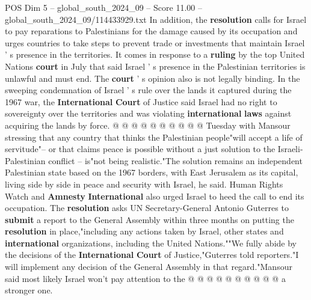 \begin{textsample}{POS Dim 5 – global\_south\_2024\_09 – Score 11.00 – global\_south\_2024\_09/114433929.txt}
In addition, the \textbf{resolution} calls for Israel to pay reparations to Palestinians for the damage caused by its occupation and urges countries to take steps to prevent trade or investments that maintain Israel ' s presence in the territories.
It comes in response to a \textbf{ruling} by the top United Nations \textbf{court} in July that said Israel ' s presence in the Palestinian territories is unlawful and must end.
The \textbf{court} ' s opinion also is not legally binding.
In the sweeping condemnation of Israel ' s rule over the lands it captured during the 1967 war, the \textbf{International} \textbf{Court} of Justice said Israel had no right to sovereignty over the territories and was violating \textbf{international} \textbf{laws} against acquiring the lands by force. @ @ @ @ @ @ @ @ @ @ Tuesday with Mansour stressing that any country that thinks the Palestinian people"will accept a life of servitude"-- or that claims peace is possible without a just solution to the Israeli-Palestinian conflict -- is"not being realistic."The solution remains an independent Palestinian state based on the 1967 borders, with East Jerusalem as its capital, living side by side in peace and security with Israel, he said.
Human Rights Watch and \textbf{Amnesty} \textbf{International} also urged Israel to heed the call to end its occupation.
The \textbf{resolution} asks UN Secretary-General Antonio Guterres to \textbf{submit} a report to the General Assembly within three months on putting the \textbf{resolution} in place,"including any actions taken by Israel, other states and \textbf{international} organizations, including the United Nations.""We fully abide by the decisions of the \textbf{International} \textbf{Court} of Justice,"Guterres told reporters."I will implement any decision of the General Assembly in that regard."Mansour said most likely Israel won't pay attention to the @ @ @ @ @ @ @ @ @ @ a stronger one.

\end{textsample}
